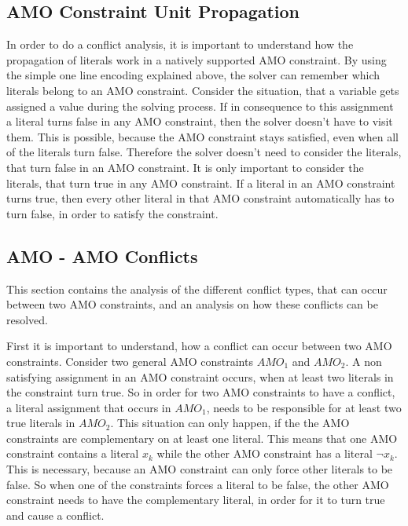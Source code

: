 \subsection{AMO Constraint Unit Propagation}

In order to do a conflict analysis, it is important to understand how the propagation of literals work in a natively supported AMO constraint. By using the simple one line encoding explained above, the solver can remember which literals belong to an AMO constraint. Consider the situation, that a variable gets assigned a value during the solving process. If in consequence to this assignment a literal turns false in any AMO constraint, then the solver doesn’t have to visit them. This is possible, because the AMO constraint stays satisfied, even when all of the literals turn false. Therefore the solver doesn't need to consider the literals, that turn false in an AMO constraint. It is only important to consider the literals, that turn true in any AMO constraint. If a literal in an AMO constraint turns true, then every other literal in that AMO constraint automatically has to turn false, in order to satisfy the constraint.

\subsection{AMO - AMO Conflicts}

This section contains the analysis of the different conflict types, that can occur between two AMO constraints, and an analysis on how these conflicts can be resolved.


First it is important to understand, how a conflict can occur between two AMO constraints. Consider two general AMO constraints $AMO_1$ and $AMO_2$. A non satisfying assignment in an AMO constraint occurs, when at least two literals in the constraint turn true. So in order for two AMO constraints to have a conflict, a literal assignment that occurs in $AMO_1$, needs to be responsible for at least two true literals in $AMO_2$. This situation can only happen, if the the AMO constraints are complementary on at least one literal. This means that one AMO constraint contains a literal $x_k$ while the other AMO constraint has a literal $\neg x_k$. This is necessary, because an AMO constraint can only force other literals to be false. So when one of the constraints forces a literal to be false, the other AMO constraint needs to have the complementary literal, in order for it to turn true and cause a conflict.

